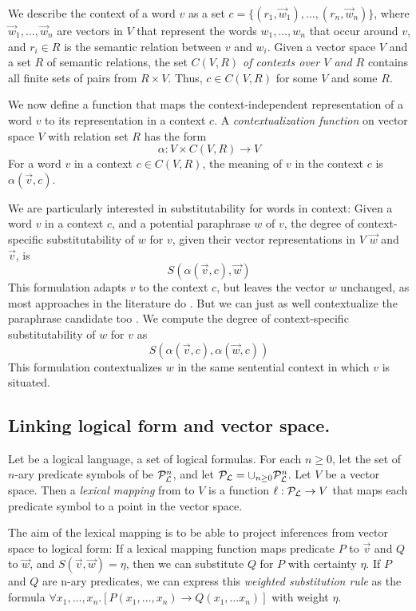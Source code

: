 We describe the context of a word $v$ as a set $c = \{(r_1, \vec w_1), \ldots,
(r_n, \vec w_n)\}$, where $\vec w_1, \ldots, \vec w_n$ are vectors in $V$ that
represent the words $w_1, \ldots, w_n$ that occur around $v$, and
$r_i \in R$ is the semantic relation between $v$ and $w_i$.
Given a vector space $V$ and a set $R$ of semantic relations, the set
\textit{$C(V, R)$ of contexts over $V$ and $R$} contains all finite sets of
pairs from $R \times V$.  Thus, $c \in C(V,R)$ for some $V$ and some $R$.

We now define a function that maps the context-independent representation of a
word $v$ to its representation in a context $c$.
A \textit{contextualization function} on vector space $V$ with relation set $R$
has the form \[ \alpha: V \times C(V, R) \to V \] For a word $v$ in a context $c
\in C(V, R)$, the meaning of $v$ in the context $c$ is $\alpha(\vec v, c)$.

We are particularly interested in substitutability for words in context: Given a
word $v$ in a context $c$, and a potential paraphrase $w$ of $v$, the degree of
context-specific substitutability of $w$ for $v$, given their vector
representations in $V$ $\vec w$ and $\vec v$, is \[ S(\alpha(\vec v, c), \vec
w)\] This formulation adapts $v$ to the context $c$, but leaves the vector $w$ 
unchanged, as most approaches in the literature do 
\citep{erk:emnlp08,MitchellLapata:08,ThaterFuerstenauPinkal:10,vandecruys:emnlp2011}.
But we can just as well contextualize the paraphrase candidate
too \citep{erk:acl2010}. We compute the degree of context-specific
substitutability of $w$ for $v$ as \[ S(\alpha(\vec v, c), \alpha(\vec w, c)) \]
This formulation contextualizes $w$ in the same sentential context in which $v$
is situated.


\subsection*{Linking logical form and vector space.} 

Let \loglang be a logical language, a set of logical formulas. For each $n \ge
0$, let the set of $n$-ary predicate symbols of \loglang be
${\cal{P}}_{{\cal{L}}}^n$, and let ${\cal{P}}_{{\cal{L}}} = \cup_{n \ge 0}
{\cal{P}}_{{\cal{L}}}^n$. Let $V$ be a vector space. Then a \emph{lexical mapping}
from \loglang to $V$ is a function $\ell:
{\cal{P}}_{{\cal{L}}} \to V$ that maps each predicate symbol to a point in the
vector space.

The aim of the lexical mapping is to be able to project inferences from vector
space to logical form: If a lexical mapping function maps predicate $P$ to $\vec
v$ and $Q$ to $ \vec w$, and $S(\vec v, \vec w) = \eta$, then we can substitute
$Q$ for $P$ with certainty $\eta$. If $P$ and $Q$ are n-ary predicates, we can
express this {\it weighted substitution rule} as the formula $\forall x_1,
\ldots, x_n.[P(x_1, \ldots, x_n) \to Q(x_1, \ldots x_n)]$ with weight $\eta$.

